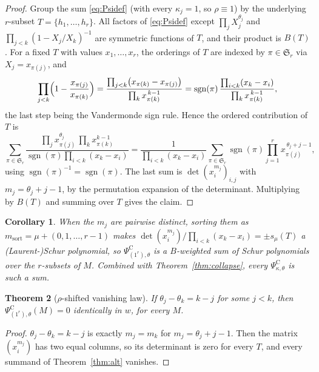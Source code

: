 \documentclass[11pt]{article}
\newtheorem{theorem}{Theorem}
\newtheorem{corollary}[theorem]{Corollary}
\theoremstyle{definition}
\theoremstyle{remark}
\newcommand{\PsiC}{\Psi^{\mathrm{C}}}
\begin{document}
\begin{proof}
Group the sum \eqref{eq:Psidef} (with every $\kappa_j=1$, so $\rho\equiv1$) by the
underlying $r$-subset $T=\{h_1,\dots,h_r\}$. All factors of \eqref{eq:Psidef} except
$\prod_j X_j^{\theta_j}$ and $\prod_{j<k}(1-X_j/X_k)^{-1}$ are symmetric functions of
$T$, and their product is $B(T)$. For a fixed $T$ with values $x_1,\dots,x_r$, the
orderings of $T$ are indexed by $\pi\in\mathfrak{S}_r$ via $X_j=x_{\pi(j)}$, and
\[
  \prod_{j<k}\Bigl(1-\frac{x_{\pi(j)}}{x_{\pi(k)}}\Bigr)
  =\frac{\prod_{j<k}\bigl(x_{\pi(k)}-x_{\pi(j)}\bigr)}{\prod_{k}x_{\pi(k)}^{\,k-1}}
  =\operatorname{sgn}(\pi)\,\frac{\prod_{i<k}(x_k-x_i)}{\prod_k x_{\pi(k)}^{\,k-1}},
\]
the last step being the Vandermonde sign rule. Hence the ordered contribution of $T$ is
\[
  \sum_{\pi\in\mathfrak{S}_r}
    \frac{\prod_j x_{\pi(j)}^{\theta_j}\,\prod_k x_{\pi(k)}^{k-1}}
         {\operatorname{sgn}(\pi)\prod_{i<k}(x_k-x_i)}
  =\frac{1}{\prod_{i<k}(x_k-x_i)}
   \sum_{\pi\in\mathfrak{S}_r}\operatorname{sgn}(\pi)\prod_{j=1}^{r}x_{\pi(j)}^{\,\theta_j+j-1},
\]
using $\operatorname{sgn}(\pi)^{-1}=\operatorname{sgn}(\pi)$. The last sum is
$\det(x_i^{m_j})_{i,j}$ with $m_j=\theta_j+j-1$, by the permutation expansion of the
determinant. Multiplying by $B(T)$ and summing over $T$ gives the claim.
\end{proof}

\begin{corollary}
When the $m_j$ are pairwise distinct, sorting them as $m_{\mathrm{sort}}=\mu+(0,1,\dots,r-1)$
makes $\det(x_i^{m_j})/\prod_{i<k}(x_k-x_i)=\pm s_\mu(T)$ a (Laurent-)Schur polynomial, so
$\PsiC_{(1^r),\theta}$ is a $B$-weighted sum of Schur polynomials over the $r$-subsets of
$M$. Combined with Theorem~\ref{thm:collapse}, \emph{every} $\PsiC_{\kappa,\theta}$ is such
a sum.
\end{corollary}

\begin{theorem}[$\rho$-shifted vanishing law]\label{thm:vanish}
If $\theta_j-\theta_k=k-j$ for some $j<k$, then $\PsiC_{(1^r),\theta}(M)=0$ identically in
$w$, for every $M$.
\end{theorem}

\begin{proof}
$\theta_j-\theta_k=k-j$ is exactly $m_j=m_k$ for $m_j=\theta_j+j-1$. Then the matrix
$(x_i^{m_j})$ has two equal columns, so its determinant is zero for every $T$, and every
summand of Theorem~\ref{thm:alt} vanishes.
\end{proof}
\end{document}
